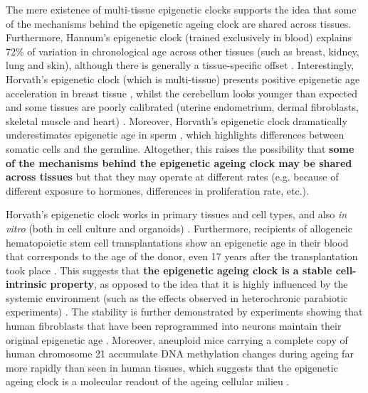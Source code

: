 \bigskip

The mere existence of multi-tissue epigenetic clocks supports the idea that some of the mechanisms behind the epigenetic ageing clock are shared across tissues. Furthermore, Hannum's epigenetic clock (trained exclusively in blood) explains 72\% of variation in chronological age across other tissues (such as breast, kidney, lung and skin), although there is generally a tissue-specific offset \citep{Hannum2013}. Interestingly, Horvath's epigenetic clock (which is multi-tissue) presents positive epigenetic age acceleration in breast tissue \citep{Sehl2017}, whilst the cerebellum looks younger than expected \citep{Horvath2015} and some tissues are poorly calibrated (uterine endometrium, dermal fibroblasts, skeletal muscle and heart) \citep{Horvath2013}. Moreover, Horvath's epigenetic clock dramatically underestimates epigenetic age in sperm \citep{Horvath2013}, which highlights differences between somatic cells and the germline. Altogether, this raises the possibility that \textbf{some of the mechanisms behind the epigenetic ageing clock may be shared across tissues} but that they may operate at different rates (e.g. because of different exposure to hormones, differences in proliferation rate, etc.). 

\bigskip

Horvath's epigenetic clock works in primary tissues and cell types, and also \textit{in vitro} (both in cell culture and organoids) \citep{Horvath2013,Hoshino2019}. Furthermore, recipients of allogeneic hematopoietic stem cell transplantations show an epigenetic age in their blood that corresponds to the age of the donor, even 17 years after the transplantation took place \citep{Soraas2019}. This suggests that \textbf{the epigenetic ageing clock is a stable cell-intrinsic property}, as opposed to the idea that it is highly influenced by the systemic environment (such as the effects observed in heterochronic parabiotic experiments) \citep{Conboy2005}. The stability is further demonstrated by experiments showing that human fibroblasts that have been reprogrammed into neurons maintain their original epigenetic age \citep{Huh2016}. Moreover, aneuploid mice carrying a complete copy of human chromosome 21 accumulate DNA methylation changes during ageing far more rapidly than seen in human tissues, which suggests that the epigenetic ageing clock is a molecular readout of the ageing cellular milieu \citep{Lowe2018}.     

\bigskip


